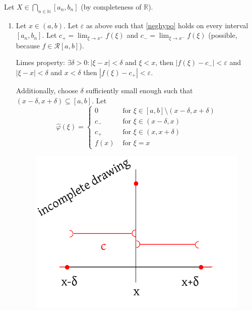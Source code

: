 \documentclass{article}
\newcommand{\card}[1]{\left|#1\right|}
\begin{document}
Let $X \in \bigcap_{n \in \mathbb N} [a_n, b_n]$ (by completeness of $\mathbb R$).
\begin{enumerate}
  \item Let $x \in (a, b)$. Let $\varepsilon$ as above such that \eqref{neghypo} holds on every interval $[a_n, b_n]$.
    Let $c_+ = \lim_{\xi \to x^+} f(\xi)$ and $c_- = \lim_{\xi \to x^-} f(\xi)$ (possible, because $f \in \mathcal R[a,b]$).

    Limes property: $\exists \delta > 0: \card{\xi - x} < \delta$ and $\xi < x$, then $\card{f(\xi) - c_-} < \varepsilon$
    and $\card{\xi - x} < \delta$ and $x < \delta$ then $\card{f(\xi) - c_+} < \varepsilon$.

    Additionally, choose $\delta$ sufficiently small enough such that
    $(x - \delta, x + \delta) \subseteq [a, b]$.
    Let
    \[
      \hat\varphi(\xi) = \begin{cases}
        0 & \text{ for } \xi \in [a,b] \setminus (x - \delta, x + \delta) \\
        c_- & \text{ for } \xi \in (x - \delta, x) \\
        c_+ & \text{ for } \xi \in (x, x + \delta) \\
        f(x) & \text{ for } \xi = x
      \end{cases}
    \]

    \begin{figure}[!h]
      \begin{center}
        \includegraphics{img/16_construction.pdf} %
      \end{center}
    \end{figure}


\end{enumerate}
\end{document}
